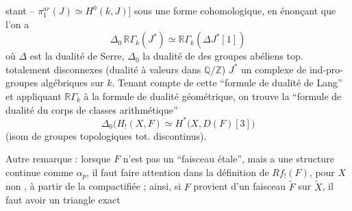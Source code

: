 stant -- $\pi_1^{ar}(J)\simeq H^0(k,J)\bigr]$ sous une forme cohomologique, en énonçant que l'on a
\[
\Delta_0\,\mathbb{R}\Gamma_k(J^*)\simeq\mathbb{R}\Gamma_{k}(\Delta J^*[1])
\]
où $\Delta$ est la dualité de Serre, $\Delta_0$ la dualité de  des groupes abéliens top. totalement disconnexes (dualité à valeurs dans $\mathbb{Q}/\mathbb{Z}$) $J^*$ un complexe de ind-pro-groupes algébriques sur $k$. Tenant compte de cette ``formule de dualité de Lang'' et appliquant $\mathbb{R}\Gamma_{k}$ à la formule de dualité  géométrique, on trouve la ``formule de dualité du corps de classes arithmétique''
\[
\boxed{\Delta_0\bigl(H_!(X,F)\simeq H^*\bigl(X,D(F)[3]\bigr)}
\]
(isom de groupes topologiques tot. discontinus).

Autre remarque : lorsque $F$ n'est pas un ``faisceau étale'', mais a une structure continue comme $\alpha_p$, il faut faire attention dans la définition de $Rf_!(F)$, pour $X$ non , à partir de la compactifiée  ; ainsi, si $F$ provient d'un faisceau  $\widetilde F$ sur $\widetilde X$, il faut avoir un triangle exact
